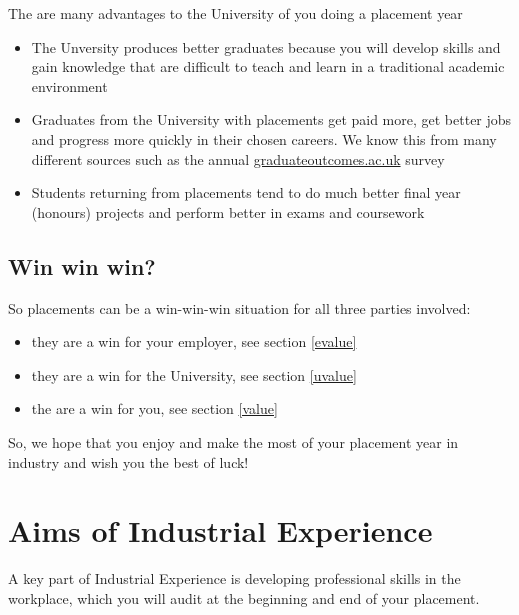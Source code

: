\documentclass[
]{book}
\providecommand{\tightlist}{%
  \setlength{\itemsep}{0pt}\setlength{\parskip}{0pt}}
\begin{document}
The are many advantages to the University of you doing a placement year

\begin{itemize}
\tightlist
\item
  The Unversity produces better graduates because you will develop skills and gain knowledge that are difficult to teach and learn in a traditional academic environment
\item
  Graduates from the University with placements get paid more, get better jobs and progress more quickly in their chosen careers. We know this from many different sources such as the annual \href{https://www.graduateoutcomes.ac.uk/}{graduateoutcomes.ac.uk} survey
\item
  Students returning from placements tend to do much better final year (honours) projects and perform better in exams and coursework
\end{itemize}

\section{Win win win?}\label{win}

So placements can be a win-win-win situation for all three parties involved:

\begin{itemize}
\tightlist
\item
  they are a win for your employer, see section \ref{evalue}
\item
  they are a win for the University, see section \ref{uvalue}
\item
  the are a win for you, see section \ref{value}
\end{itemize}

So, we hope that you enjoy and make the most of your placement year in industry and wish you the best of luck!

\chapter{Aims of Industrial Experience}\label{aims}

A key part of Industrial Experience is developing professional skills in the workplace, which you will audit at the beginning and end of your placement.
\end{document}
